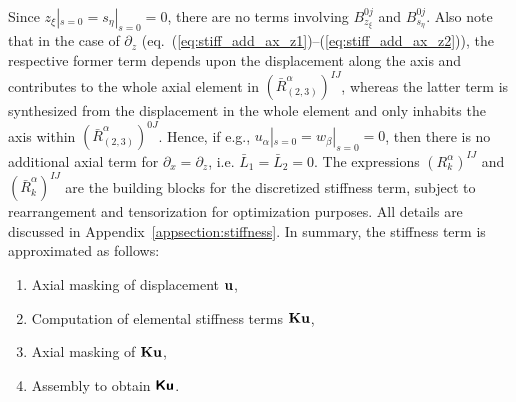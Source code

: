 \documentclass[11pt,letter,fleqn,english,notitlepage]{article}
\newcommand{\bu}{\mbox{${\bf u}$}} \newcommand{\bv}{\mbox{${\bf v}$}}
\newcommand{\bK}{\mbox{${\bf K}$}} \newcommand{\bS}{\mbox{${\bf S}$}}
\newcommand{\bsfK}{\mbox{\boldmath $\bf {\mathsf K}$}}
\newcommand{\bsfu}{\mbox{\boldmath $\bf {\mathsf u}$}}
\begin{document}
\label{eq:stiff_add_ax_z1}\\
\label{eq:stiff_add_ax_z2}
\ena
%
Since $z_\xi|_{s=0}=s_\eta|_{s=0}=0$, there are no terms involving 
$B^{0j}_{z_\xi}$ and $B^{0j}_{s_\eta}$.
Also note that in the case of $\partial_z$ 
(eq.~(\ref{eq:stiff_add_ax_z1})--(\ref{eq:stiff_add_ax_z2})), the respective 
former term depends upon the displacement along the axis and contributes to 
the whole axial element in $(\bar{R}^\alpha_{(2,3)})^{IJ}$, whereas the latter 
term is synthesized from the displacement in the whole element and only 
inhabits the axis within $(\bar{R}^\alpha_{(2,3)})^{0J}$. Hence, if e.g., 
$u_\alpha|_{s=0}=w_\beta|_{s=0}=0$, then there is no additional axial term 
for $\partial_x=\partial_z$, i.e. $\bar{L}_1=\bar{L}_2=0$.
%
The expressions $(R_k^\alpha)^{IJ}$ and 
$(\bar{R}_k^\alpha)^{IJ}$ are the building blocks for the discretized 
stiffness term, subject to rearrangement and tensorization 
for optimization purposes. All details are discussed in 
Appendix~\ref{appsection:stiffness}. In summary, the stiffness term is 
approximated as follows:
%
\begin{enumerate}
\item Axial masking of displacement $\bu$,
\item Computation of elemental stiffness terms $\bK\bu$,
\item Axial masking of $\bK\bu$,
\item Assembly to obtain $\bsfK\bsfu$.
\end{enumerate}
%
\end{document}
